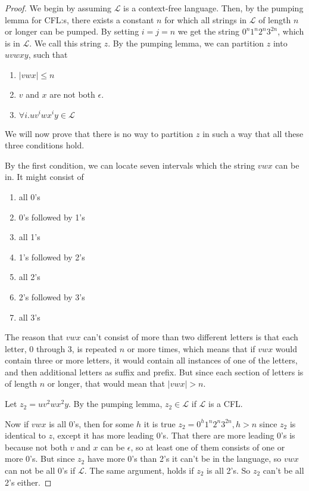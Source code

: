\documentclass{article}
\begin{document}
\begin{proof}
We begin by assuming $\mathcal{L}$ is a context-free language. Then, by the pumping lemma for CFL:s, there exists a constant $n$ for which all strings in $\mathcal{L}$ of length $n$ or longer can be pumped. By setting $i=j=n$ we get the string $0^n1^n2^n3^{2n}$, which is in $\mathcal{L}$. We call this string $z$. By the pumping lemma, we can partition $z$ into $uvwxy$, such that


\begin{enumerate}
    \item $|vwx| \leq n$
    \item $v$ and $x$ are not both $\epsilon$.
    \item $\forall i . uv^iwx^iy \in \mathcal{L}$
\end{enumerate}

We will now prove that there is no way to partition $z$ in such a way that all these three conditions hold.

By the first condition, we can locate seven intervals which the string $vwx$ can be in. It might consist of

\begin{enumerate}
    \item all 0's
    \item 0's followed by 1's
    \item all 1's
    \item 1's followed by 2's
    \item all 2's
    \item 2's followed by 3's
    \item all 3's
\end{enumerate}

The reason that $vwx$ can't consist of more than two different letters is that each letter, 0 through 3, is repeated $n$ or more times, which means that if $vwx$ would contain three or more letters, it would contain all instances of one of the letters, and then additional letters as suffix and prefix. But since each section of letters is of length $n$ or longer, that would mean that $|vwx| > n$.

Let $z_2 = uv^2wx^2y$. By the pumping lemma, $z_2 \in \mathcal{L}$ if $\mathcal{L}$ is a CFL.

Now if $vwx$ is all 0's, then for some $h$ it is true $z_2 = 0^h1^n2^n3^{2n}, h > n$ since $z_2$ is identical to $z$, except it has more leading 0's. That there are more leading 0's is because not both $v$ and $x$ can be $\epsilon$, so at least one of them consists of one or more 0's. But since $z_2$ have more 0's than 2's it can't be in the language, so $vwx$ can not be all 0's if $\mathcal{L}$. The same argument, holds if $z_2$ is all 2's. So $z_2$ can't be all 2's either.


\end{proof}
\end{document}
